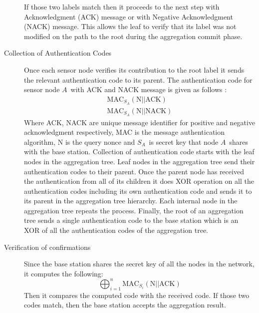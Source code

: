 \begin{description}
			If those two labels match then it proceeds to the next step with Acknowledgment (ACK) message or with Negative Acknowledgment (NACK) message.
			This allows the leaf to verify that its label was not modified on the path to the root during the aggregation commit phase.
		\item[Collection of Authentication Codes] 
			Once each sensor node verifies its contribution to the root label it sends the relevant authentication code to its parent.
			The authentication code for sensor node $A$\ with ACK and NACK message is given as follows :
			\begin{equation}
				\begin{array}{l}
					\mbox{MAC}_{S_{A}}( \mbox{N} || \mbox{ACK})\\
					\mbox{MAC}_{S_{A}}( \mbox{N} || \mbox{NACK})	
				\end{array}
			\end{equation}
			Where ACK, NACK are unique message identifier for positive and negative acknowledgment respectively, 
			MAC is  the message authentication algorithm, 
			N is the query nonce and $S_{A}$\ is secret key that node $A$\ shares with the base station.
			Collection of authentication code starts with the leaf nodes in the aggregation tree.
			Leaf nodes in the aggregation tree send their authentication codes to their parent.
			Once the parent node has received the authentication from all of its children it does XOR operation on all the authentication codes including its own authentication code and sends it to its parent in the aggregation tree hierarchy.
			Each internal node in the aggregation tree repeats the process.
			Finally, the root of an aggregation tree sends a single authentication code to the base station which is an XOR of all the authentication codes of the aggregation tree.  
		\item[Verification of confirmations]
			Since the base station shares the secret key of all the nodes in the network, it computes the following:
			\begin{equation}
				\bigoplus_{i = 1}^n \mbox{MAC}_{S_{i}}(\mbox{N} || \mbox{ACK})
			\end{equation}
			Then it compares the computed code with the received code. 
			If those two codes match, then the base station accepts the aggregation result.
	\end{description}

